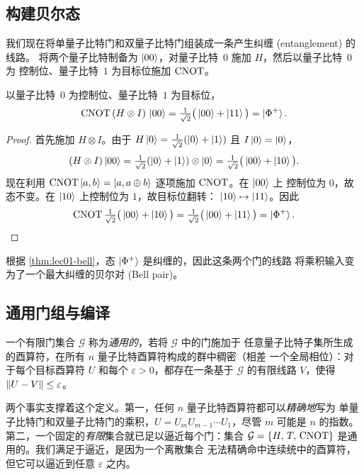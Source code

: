 \subsection{构建贝尔态}

我们现在将单量子比特门和双量子比特门组装成一条产生纠缠 (entanglement) 的线路。
将两个量子比特制备为 $\ket{00}$，对量子比特~$0$ 施加 $H$，然后以量子比特~$0$ 为
控制位、量子比特~$1$ 为目标位施加 $\mathrm{CNOT}$。

\begin{theorem}[贝尔态制备]\label{thm:lec01-bellprep}
以量子比特~$0$ 为控制位、量子比特~$1$ 为目标位，
\[
  \mathrm{CNOT}\,(H\otimes I)\,\ket{00}
    = \tfrac{1}{\sqrt2}\big(\ket{00}+\ket{11}\big)=\ket{\Phi^{+}}.
\]
\end{theorem}

\begin{proof}
首先施加 $H\otimes I$。由于 $H\ket{0}=\tfrac{1}{\sqrt2}(\ket{0}+\ket{1})$ 且
$I\ket{0}=\ket{0}$，
\[
  (H\otimes I)\ket{00}
    = \tfrac{1}{\sqrt2}(\ket{0}+\ket{1})\otimes\ket{0}
    = \tfrac{1}{\sqrt2}\big(\ket{00}+\ket{10}\big).
\]
现在利用 $\mathrm{CNOT}\ket{a,b}=\ket{a,a\oplus b}$ 逐项施加 $\mathrm{CNOT}$。在 $\ket{00}$ 上
控制位为 $0$，故态不变。在 $\ket{10}$ 上控制位为 $1$，故目标位翻转：
$\ket{10}\mapsto\ket{11}$。因此
\[
  \mathrm{CNOT}\,\tfrac{1}{\sqrt2}\big(\ket{00}+\ket{10}\big)
    = \tfrac{1}{\sqrt2}\big(\ket{00}+\ket{11}\big)=\ket{\Phi^{+}}. \qedhere
\]
\end{proof}

根据 \cref{thm:lec01-bell}，态 $\ket{\Phi^{+}}$ 是纠缠的，因此这条两个门的线路
将乘积输入变为了一个最大纠缠的贝尔对 (Bell pair)。

\subsection{通用门组与编译}

\begin{definition}[通用门组]\label{def:lec01-universal}
一个有限门集合 $\mathcal{G}$ 称为\emph{通用的}，若将 $\mathcal{G}$ 中的门施加于
任意量子比特子集所生成的酉算符，在所有 $n$ 量子比特酉算符构成的群中稠密（相差
一个全局相位）：对于每个目标酉算符 $U$ 和每个 $\varepsilon>0$，都存在一条基于
$\mathcal{G}$ 的有限线路 $V$，使得 $\left\lVert U-V \right\rVert\le\varepsilon$。
\end{definition}

两个事实支撑着这个定义。第一，任何 $n$ 量子比特酉算符都可以\emph{精确地}写为
单量子比特门和双量子比特门的乘积，$U=U_{m}U_{m-1}\cdots U_{1}$，尽管 $m$ 可能是
$n$ 的指数。第二，一个固定的\emph{有限}集合就已足以逼近每个门：集合
$\mathcal{G}=\{H,\,T,\,\mathrm{CNOT}\}$ 是通用的。我们满足于逼近，是因为一个离散集合
无法精确命中连续统中的酉算符，但它可以逼近到任意 $\varepsilon$ 之内。

